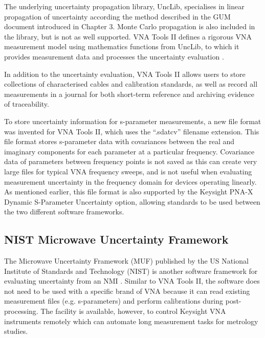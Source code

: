 \documentclass[../thesis/thesis.tex]{subfiles}
\begin{document}
The underlying uncertainty propagation library, UncLib, specialises in linear propagation of uncertainty according the method described in the GUM document introduced in Chapter 3. Monte Carlo propagation is also included in the library, but is not as well supported. VNA Tools II defines a rigorous VNA measurement model using mathematics functions from UncLib, to which it provides measurement data and processes the uncertainty evaluation \cite{Wollensack_2012}.

In addition to the uncertainty evaluation, VNA Tools II allows users to store collections of characterised cables and calibration standards, as well as record all measurements in a journal for both short-term reference and archiving evidence of traceability.

To store uncertainty information for s-parameter measurements, a new file format was invented for VNA Tools II, which uses the ``.sdatcv'' filename extension. This file format stores s-parameter data with covariances between the real and imaginary components for each parameter at a particular frequency. Covariance data of parameters between frequency points is not saved as this can create very large files for typical VNA frequency sweeps, and is not useful when evaluating measurement uncertainty in the frequency domain for devices operating linearly. As mentioned earlier, this file format is also supported by the Keysight PNA-X Dynamic S-Parameter Uncertainty option, allowing standards to be used between the two different software frameworks.

\subsection{NIST Microwave Uncertainty Framework}

The Microwave Uncertainty Framework (MUF) published by the US National Institute of Standards and Technology (NIST) is another software framework for evaluating uncertainty from an NMI \cite{MUFWebsite, Ginley_2016, Ginley_2017}. Similar to VNA Tools II, the software does not need to be used with a specific brand of VNA because it can read existing measurement files (e.g. s-parameters) and perform calibrations during post-processing. The facility is available, however, to control Keysight VNA instruments remotely which can automate long measurement tasks for metrology studies.
\end{document}

